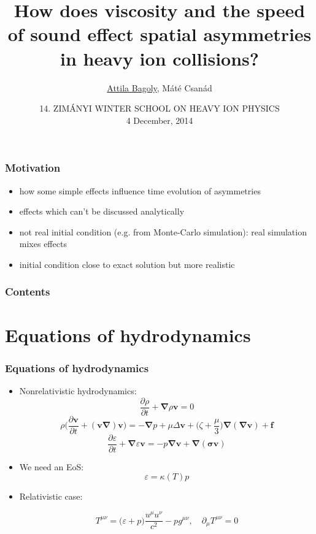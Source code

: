 \documentclass{beamer}
\title[Numerical hydrodynamics]{How does viscosity and the speed of sound effect spatial asymmetries in heavy ion collisions?}
\author{\underline{Attila Bagoly}, Máté Csanád}
\date[4 December, 2014]{14. ZIMÁNYI WINTER SCHOOL ON HEAVY ION PHYSICS\\ 4 December, 2014}
\institute[ELTE]{Eötvös University}
\begin{document}
\begin{frame}
  \titlepage
\end{frame}

\begin{frame}
\frametitle{Motivation}
\begin{itemize}
\item how some simple effects influence time evolution of asymmetries
\item  effects which can't be discussed analytically
\item not real initial condition (e.g. from Monte-Carlo simulation): real simulation mixes effects
\item initial condition close to exact solution but more realistic
\end{itemize}
\end{frame}

\begin{frame}
\frametitle{Contents}
\tableofcontents
\end{frame}

\section{Equations of hydrodynamics}
\begin{frame}
\frametitle{Equations of hydrodynamics}
\begin{itemize}
\item Nonrelativistic hydrodynamics:
\begin{equation}
\frac{\partial \rho}{\partial t} + \bm{\nabla}\rho\bm{v}=0
\end{equation}
\begin{equation}
\rho\Big(\frac{\partial \bm{v}}{\partial t}+(\bm{v\nabla})\bm{v}\Big)=-\bm{\nabla}p +\mu\Delta\bm{v}+\Big(\zeta+\frac{\mu}{3}\Big)\bm{\nabla}(\bm{\nabla v})+\bm{f}
\end{equation}
\begin{equation}
\frac{\partial \varepsilon}{\partial t}+\bm{\nabla}\varepsilon\bm{v}=-p\bm{\nabla v}+\bm{\nabla(\sigma v)}
\end{equation}

\item We need an EoS:
\begin{equation}
\varepsilon=\kappa(T)p
\end{equation}

\item Relativistic case:
\begin{large}
\begin{equation}
T^{\mu\nu}=\big(\varepsilon+p\big)\frac{u^\mu u^\nu}{c^2}-pg^{\mu\nu},\quad \partial_\mu T^{\mu\nu}=0
\end{equation}
\end{large}
\end{itemize}
\end{frame}
\end{document}

